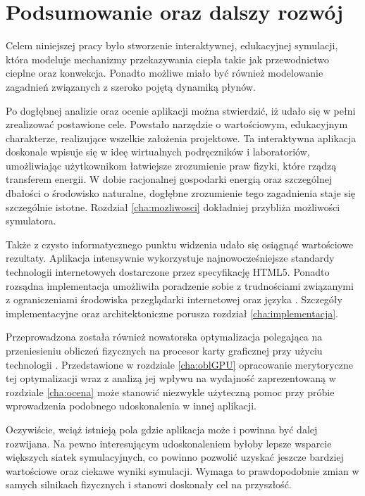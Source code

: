 \chapter{Podsumowanie oraz dalszy rozwój}

Celem niniejszej pracy było stworzenie interaktywnej, edukacyjnej symulacji,
która modeluje mechanizmy przekazywania ciepła takie jak przewodnictwo cieplne
oraz konwekcja. Ponadto możliwe miało być również modelowanie zagadnień
związanych z szeroko pojętą dynamiką płynów.

Po dogłębnej analizie oraz ocenie aplikacji \en można stwierdzić, iż udało się
w pełni zrealizować postawione cele. Powstało narzędzie o wartościowym,
edukacyjnym charakterze, realizujące wszelkie założenia projektowe. Ta
interaktywna aplikacja doskonale wpisuje się w ideę wirtualnych podręczników i
laboratoriów, umożliwiając użytkownikom łatwiejsze zrozumienie praw fizyki,
które rządzą transferem energii. W dobie racjonalnej gospodarki energią oraz
szczególnej dbałości o środowisko naturalne, dogłębne zrozumienie tego
zagadnienia staje się szczególnie istotne. Rozdział \ref{cha:mozliwosci}
dokładniej przybliża możliwości symulatora.

Także z czysto informatycznego punktu widzenia udało się osiągnąć wartościowe
rezultaty. Aplikacja intensywnie wykorzystuje najnowocześniejsze standardy
technologii internetowych dostarczone przez specyfikację HTML5. Ponadto
rozsądna implementacja umożliwiła poradzenie sobie z trudnościami związanymi z
ograniczeniami środowiska przeglądarki internetowej oraz języka \js. Szczegóły
implementacyjne oraz architektoniczne porusza rozdział
\ref{cha:implementacja}.

Przeprowadzona została również nowatorska optymalizacja polegająca na
przeniesieniu obliczeń fizycznych na procesor karty graficznej przy użyciu
technologii . Przedstawione w rozdziale \ref{cha:oblGPU} opracowanie
merytoryczne tej optymalizacji wraz z analizą jej wpływu na wydajność
zaprezentowaną w rozdziale \ref{cha:ocena} może stanowić niezwykle użyteczną
pomoc przy próbie wprowadzenia podobnego udoskonalenia w innej aplikacji.

Oczywiście, wciąż istnieją pola gdzie aplikacja może i powinna być dalej
rozwijana. Na pewno interesującym udoskonaleniem byłoby lepsze wsparcie większych
siatek symulacyjnych, co powinno pozwolić uzyskać jeszcze bardziej wartościowe
oraz ciekawe wyniki symulacji. Wymaga to prawdopodobnie zmian w samych
silnikach fizycznych i stanowi doskonały cel na przyszłość.

